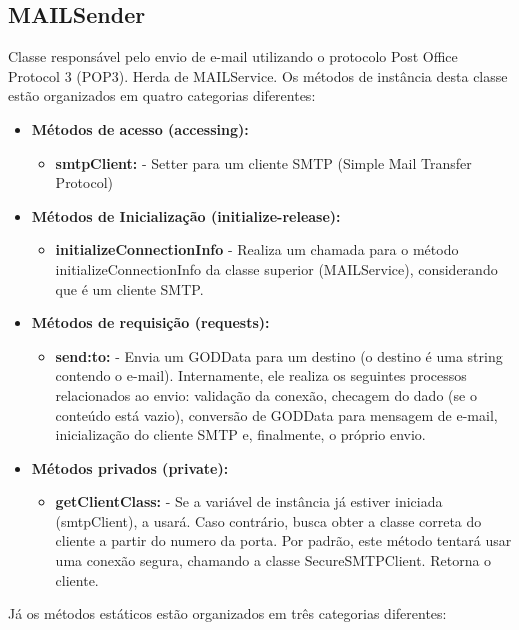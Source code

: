 \subsection{MAILSender}

Classe responsável pelo envio de e-mail utilizando o protocolo Post Office Protocol 3 (POP3). Herda de MAILService. Os métodos de instância desta classe estão organizados em quatro categorias diferentes:

\begin{itemize}
	\item \textbf{Métodos de acesso (accessing):}
	\begin{itemize}
		\item \textbf{smtpClient:} - Setter para um cliente SMTP (Simple Mail Transfer Protocol)
	\end{itemize}
	\item \textbf{Métodos de Inicialização (initialize-release):}
	\begin{itemize}
		\item \textbf{initializeConnectionInfo} - Realiza um chamada para o método initializeConnectionInfo da classe superior (MAILService), considerando que é um cliente SMTP.
	\end{itemize}
	\item \textbf{Métodos de requisição (requests):}
	\begin{itemize}
		\item \textbf{send:to:} - Envia um GODData para um destino (o destino é uma string contendo o e-mail). Internamente, ele realiza os seguintes processos relacionados ao envio: validação da conexão, checagem do dado (se o conteúdo está vazio), conversão de GODData para mensagem de e-mail, inicialização do cliente SMTP e, finalmente, o próprio envio.
	\end{itemize}
	\item \textbf{Métodos privados (private):}
	\begin{itemize}
		\item \textbf{getClientClass:} - Se a variável de instância já estiver iniciada (smtpClient), a usará. Caso contrário, busca obter a classe correta do cliente a partir do numero da porta. Por padrão, este método tentará usar uma conexão segura, chamando a classe SecureSMTPClient. Retorna o cliente.
	\end{itemize}
\end{itemize}

Já os métodos estáticos estão organizados em três categorias diferentes:

